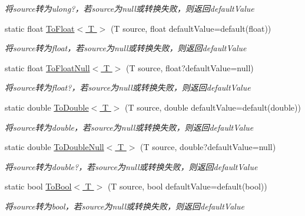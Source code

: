\begin{DoxyCompactItemize}
\begin{DoxyCompactList}\small\item\em 将source转为ulong?，若source为null或转换失败，则返回default\-Value \end{DoxyCompactList}\item 
static float \hyperlink{class_x_c_l_net_tools_1_1_common_1_1_data_type_convert_a5b731d77475825f8076062700300fb1d}{To\-Float$<$ T $>$} (T source, float default\-Value=default(float))
\begin{DoxyCompactList}\small\item\em 将source转为float，若source为null或转换失败，则返回default\-Value \end{DoxyCompactList}\item 
static float \hyperlink{class_x_c_l_net_tools_1_1_common_1_1_data_type_convert_a9002d5c068ca8576f2319ae15c941506}{To\-Float\-Null$<$ T $>$} (T source, float?default\-Value=null)
\begin{DoxyCompactList}\small\item\em 将source转为float?，若source为null或转换失败，则返回default\-Value \end{DoxyCompactList}\item 
static double \hyperlink{class_x_c_l_net_tools_1_1_common_1_1_data_type_convert_a331227ffa8db1d71402b3154da934f9c}{To\-Double$<$ T $>$} (T source, double default\-Value=default(double))
\begin{DoxyCompactList}\small\item\em 将source转为double，若source为null或转换失败，则返回default\-Value \end{DoxyCompactList}\item 
static double \hyperlink{class_x_c_l_net_tools_1_1_common_1_1_data_type_convert_a41cb50328a52f09ca9a26a0077e9f819}{To\-Double\-Null$<$ T $>$} (T source, double?default\-Value=null)
\begin{DoxyCompactList}\small\item\em 将source转为double?，若source为null或转换失败，则返回default\-Value \end{DoxyCompactList}\item 
static bool \hyperlink{class_x_c_l_net_tools_1_1_common_1_1_data_type_convert_a4368d6697502ec519f8fc5c8c3a4cc03}{To\-Bool$<$ T $>$} (T source, bool default\-Value=default(bool))
\begin{DoxyCompactList}\small\item\em 将source转为bool，若source为null或转换失败，则返回default\-Value \end{DoxyCompactList}\item 

\end{DoxyCompactItemize}
